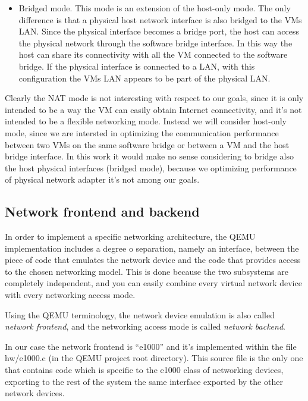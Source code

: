 \begin{itemize}
    \item Bridged mode. This mode is an extension of the host-only mode. The only difference is that a physical host network interface
	  is also bridged to the VMs LAN. Since the physical interface becomes a bridge port, the host can access the physical network
	  through the software bridge interface.
	  In this way the host can share its connectivity with all the VM connected to the software bridge. If the physical interface
	  is connected to a LAN, with this configuration the VMs LAN appears to be part of the physical LAN.
	  
\end{itemize}
	
Clearly the NAT mode is not interesting with respect to our goals, since it is only intended to be a way the VM can easily obtain
Internet connectivity, and it's not intended to be a flexible networking mode. Instead we will consider host-only mode, since we
are intersted in optimizing the communication performance between two VMs on the same software bridge or between a VM and the host
bridge interface. In this work it would make no sense considering to bridge also the host physical interfaces (bridged mode), 
because we optimizing performance of physical network adapter it's not among our goals.


\subsection{Network frontend and backend}
\label{sec:frontback}
In order to implement a specific networking architecture, the QEMU implementation includes a degree o separation, namely an interface,
between the piece of code that emulates the network device and the code that provides access to the chosen networking model.
This is done because the two subsystems are completely independent, and you can easily combine every virtual network device with
every networking access mode.

Using the QEMU terminology, the network device emulation is also called \emph{network frontend}, and the networking access mode is
called \emph{network backend}. 

\vspace{0.5cm}

In our case the network frontend is ``e1000'' and it's implemented within the file hw/e1000.c (in the QEMU project root directory).
This source file is the only one that contains code which is specific to the e1000 class of networking devices, exporting to the rest 
of the system the same interface exported by the other network devices.


